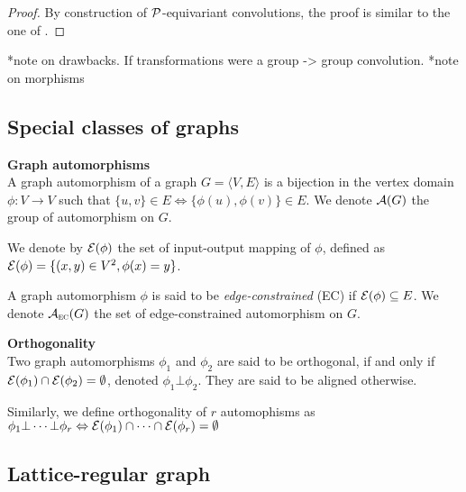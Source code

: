 \begin{proof}
By construction of $\mathcal{P}$-equivariant convolutions, the proof is similar to the one of .
\end{proof}



*note on drawbacks. If transformations were a group -> group convolution.
*note on morphisms

\subsection{Special classes of graphs}


\begin{definition}\textbf{Graph automorphisms}\\
A graph automorphism of a graph $G = \langle V,E \rangle$ is a bijection in the vertex domain $\phi: V \rightarrow V$ such that $\{u,v\} \in E \Leftrightarrow \{\phi(u), \phi(v)\} \in E$. We denote $\mathcal{A}(G)$ the group of automorphism on $G$.

We denote by $\mathcal{E}(\phi)$ the set of input-output mapping of $\phi$, defined as $\mathcal{E}(\phi) = \{ (x,y) \in V^2, \phi(x) = y \}$.

A graph automorphism $\phi$ is said to be \emph{edge-constrained} (EC) if $\mathcal{E}(\phi) \subseteq E$. We denote $\mathcal{A}_{\operatorname{\textsc{ec}}}(G)$ the set of edge-constrained automorphism on $G$.
\end{definition}

\begin{definition}\textbf{Orthogonality}\\
Two graph automorphisms $\phi_1$ and $\phi_2$ are said to be orthogonal, if and only if $\mathcal{E}(\phi_1) \cap \mathcal{E}(\phi_2) = \emptyset$, denoted $\phi_1 \bot \phi_2$. They are said to be aligned otherwise.

Similarly, we define orthogonality of $r$ automophisms as $\phi_1 \bot \cdots \bot \phi_r \Leftrightarrow \mathcal{E}(\phi_1) \cap \cdots \cap \mathcal{E}(\phi_r) = \emptyset$
\end{definition}


\subsection{Lattice-regular graph}


